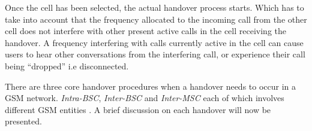 Once the cell has been selected, the actual handover process starts. Which has to take into account that the frequency allocated to the incoming call from the other cell does not interfere with other present active calls in the cell receiving the handover\cite{Eisenblatter,GSMArchitectureProtocolsServices,wirelesstelcoMullet}. A frequency interfering with calls currently active in the cell can cause users to hear other conversations from the interfering call, or experience their call being ``dropped'' i.e disconnected\cite{Eisenblatter}. 

There are three core handover procedures when a handover needs to occur in a GSM network. \emph{Intra-BSC}, \emph{Inter-BSC} and \emph{Inter-MSC} each of which involves different GSM entities \cite{wirelesstelcoMullet}. A brief discussion on each handover will now be presented.

